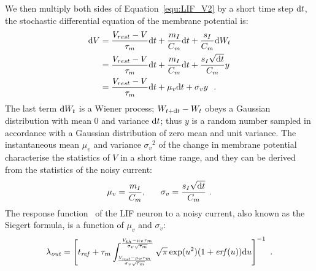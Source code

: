 	We then multiply both sides of Equation~\ref{equ:LIF_V2} by a short time step $\mathrm{d} t$, the stochastic differential equation of the membrane potential is: %
	\begin{equation}
	\begin{aligned}
	\mathrm{d} V&= \frac{V_{rest} - V}{\tau_m }\mathrm{d} t + \frac{m_I}{C_m} \mathrm{d} t + \frac{s_I}{C_m}  \mathrm{d} W_t \\
	&=\frac{V_{rest} - V}{\tau_m }\mathrm{d} t + \frac{m_I}{C_m} \mathrm{d} t + \frac{s_I \sqrt{\mathrm{d} t}}{C_m} y  \\
	&=\frac{V_{rest} - V}{\tau_m }\mathrm{d} t + \mu_v \mathrm{d} t + \sigma_v y ~~. 
	\end{aligned}
	\end{equation}	
	The last term $\mathrm{d} W_t$ is a Wiener process; $W_{t +\mathrm{d} t} - W_{t}$ obeys a Gaussian distribution with mean 0 and variance $\mathrm{d} t$; thus $y$ is a random number sampled in accordance with a Gaussian distribution of zero mean and unit variance.
	The instantaneous mean $\mu_v$ and variance ${\sigma_v}^2$ of the change in membrane potential characterise the statistics of $V$ in a short time range, and they can be derived from the statistics of the noisy current:
	\begin{equation}
	\mu_v =\dfrac{m_I}{C_m}, ~~~~~ \sigma_v = \dfrac{s_I \sqrt{\mathrm{d} t}}{C_m}~.
	\end{equation}
	The response function~\citep{rauch2003neocortical,la2008response} of the LIF neuron to a noisy current, also known as the Siegert formula, is a function of $\mu_v$ and $\sigma_v$:
	\begin{equation}
	\lambda_\mathit{out}=
	\left [ t_\mathit{ref}+\tau_m \int_{\frac{V_\mathit{rest}-\mu_v \tau_m }{\sigma_v \sqrt{\tau_m}}}^{\frac{V_{th}-\mu_v \tau_m }{\sigma_v \sqrt{\tau_m}}} \sqrt{\pi} \exp(u^{2}) (1+\mathit{erf}(u)) \mathrm{d} u \right ]^{-1} ~.
	\label{equ:siegert}
	\end{equation}
	

